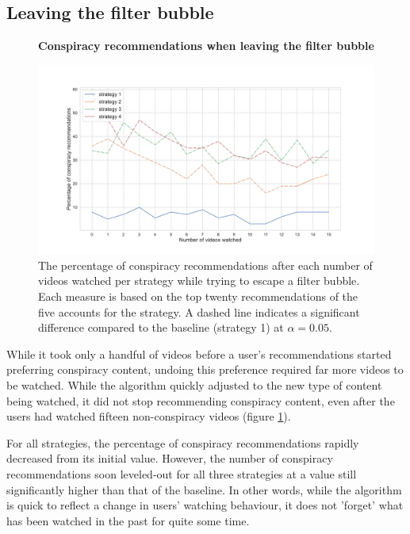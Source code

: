 \documentclass[../main.tex]{subfiles}
\begin{document}
\subsection{Leaving the filter bubble}

\begin{figure}[t]
  \textbf{Conspiracy recommendations when leaving the filter bubble}\par\medskip
  \centering
  \includegraphics[keepaspectratio, width=\textwidth]{images/conspiracy_recs_2.pdf}
  \caption{The percentage of conspiracy recommendations after each number of videos watched per strategy while trying to escape a filter bubble. Each measure is based on the top twenty recommendations of the five accounts for the strategy. A dashed line indicates a significant difference compared to the baseline (strategy 1) at $\alpha = 0.05$.}
  \label{fig:con_recs_2}
\end{figure}

While it took only a handful of videos before a user's recommendations started preferring conspiracy content, 
undoing this preference required far more videos to be watched. While the algorithm quickly adjusted to the 
new type of content being watched, it did not stop recommending conspiracy content, even after the users had
watched fifteen non-conspiracy videos (figure \ref{fig:con_recs_2}). 

For all strategies, the percentage of conspiracy recommendations rapidly decreased from its initial value. 
However, the number of conspiracy recommendations soon leveled-out for all three strategies at a value still 
significantly higher than that of the baseline. In other words, while the algorithm is quick to reflect a change
in users' watching behaviour, it does not 'forget' what has been watched in the past for quite some time. 
\end{document}

